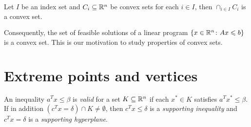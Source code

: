 \begin{proposition}
  \label{lem:1}
  Let $I$ be an index set and $C_i \subseteq \mathbb{R}^n$ be convex sets for
  each $i \in I$, then $\cap_{i \in I}C_i$ is a convex set.
\end{proposition}

Consequently, the set of feasible solutions of a linear program $\{x
\in \mathbb{R}^n \colon Ax \leqslant b\}$ is a convex set. This is our motivation
to study properties of convex sets.


\section{Extreme points and vertices}
\label{sec:extr-points-vert}


\begin{definition}
  An inequality $a^Tx \leq \beta$ is \emph{valid} for a  set $K \subseteq \mathbb{R}^n$ if each $x^* \in K$ satisfies $a^Tx^* \leq \beta$.  If in addition $(c^Tx = \delta) \cap K \neq\emptyset$,
then $c^Tx\leq\delta$ is a \emph{supporting inequality} and $c^Tx = \delta$ is a
\emph{supporting hyperplane}. 
\end{definition}



     
      
      
      
      
          
      
          
    

